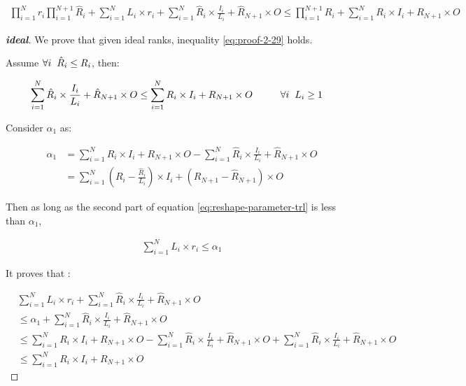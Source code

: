 \documentclass{article}
\begin{document}
\begin{align}
	\label{eq:proof-2-29}
	\prod_{i=1}^{N}r_i \prod_{i=1}^{N+1}\hat{R}_i + \sum_{i=1}^{N}L_i\times r_i + \sum_{i=1}^{N} \hat{R}_i \times \frac{I_i}{L_i} + \hat{R}_{N+1}\times O \leq
	\prod_{i=1}^{N+1}R_i + \sum_{i=1}^{N} R_i\times I_i + R_{N+1}\times O 
\end{align}

\begin{proof}[\textbf{ideal}]
	We prove that given ideal ranks, inequality \ref{eq:proof-2-29} holds. 
	
	Assume $\forall i \hspace{2mm}\hat{R}_i \leq R_i$, then:
	
	\begin{align}
		\label{eq:proof-2-30}
		\sum_{i=1}^{N} \hat{R}_i \times \frac{I_i}{L_i}  + \hat{R}_{N+1}\times O\leq \sum_{i=1}^{N}R_i\times I_i + R_{N+1}\times O \hspace{10mm}&  \forall i \hspace{2mm} L_i \geq 1
	\end{align}

	Consider $\alpha_1$ as:
	
	\begin{align}
		\label{eq:proof-2-31}
		\alpha_1 &= \sum_{i=1}^{N}R_i\times I_i + R_{N+1}\times O - \sum_{i=1}^{N} \hat{R}_i \times \frac{I_i}{L_i}  + \hat{R}_{N+1}\times O
		\nonumber\\
		&= \sum_{i=1}^{N}(R_i - \frac{\hat{R}_i}{L_i})\times I_i + (R_{N+1} - \hat{R}_{N+1})\times O
	\end{align}

	Then as long as the second part of equation \ref{eq:reshape-parameter-trl} is less than $\alpha_1$,
	
	\begin{align}
		\label{eq:proof-2-32}
		\sum_{i=1}^{N}L_i\times r_i \leq \alpha_1
	\end{align}

It proves that :
	
	\begin{align}
		\label{eq:proof-2-33}
		&\sum_{i=1}^{N}L_i\times r_i + \sum_{i=1}^{N} \hat{R}_i \times \frac{I_i}{L_i} + \hat{R}_{N+1}\times O 
		\nonumber\\
		&\leq
		\alpha_1 + \sum_{i=1}^{N} \hat{R}_i \times \frac{I_i}{L_i} + \hat{R}_{N+1}\times O 
		\nonumber\\
		&\leq
		\sum_{i=1}^{N}R_i\times I_i + R_{N+1}\times O - \sum_{i=1}^{N} \hat{R}_i \times \frac{I_i}{L_i}  + \hat{R}_{N+1}\times O
		+ \sum_{i=1}^{N} \hat{R}_i \times \frac{I_i}{L_i} + \hat{R}_{N+1}\times O 
		\nonumber\\
		&\leq
		\sum_{i=1}^{N} R_i\times I_i + R_{N+1}\times O 
	\end{align}


\end{proof}
\end{document}
